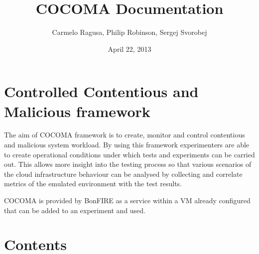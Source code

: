 \documentclass[letterpaper,10pt,english]{sphinxhowto}
\title{COCOMA Documentation}
\date{April 22, 2013}
\author{Carmelo Ragusa, Philip Robinson, Sergej Svorobej}
\begin{document}
\maketitle
\tableofcontents
{}\label{index::doc}



\section{Controlled Contentious and Malicious framework}
\label{index:controlled-contentious-and-malicious-framework}\label{index:cocoma}
The aim of COCOMA framework is to create, monitor and control contentious and malicious system workload. By using this framework experimenters are able to create operational conditions under which tests and experiments can be carried out. This allows more insight into the testing process so that various scenarios of the cloud infrastructure behaviour can be analysed by collecting and correlate metrics of the emulated environment with the test results.

COCOMA is provided by BonFIRE as a service within a VM already configured that can be added to an experiment and used.


\section{Contents}
\label{index:contents}
\end{document}
